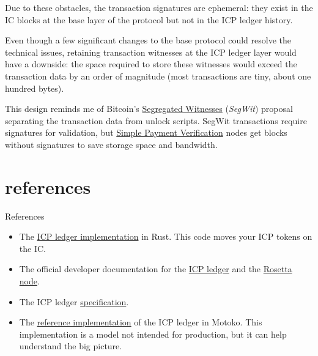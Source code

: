 \documentclass{article}
\begin{document}
Due to these obstacles, the transaction signatures are ephemeral: they exist in the IC blocks at the base layer of the protocol but not in the ICP ledger history.

Even though a few significant changes to the base protocol could resolve the technical issues, retaining transaction witnesses at the ICP ledger layer would have a downside: the space required to store these witnesses would exceed the transaction data by an order of magnitude (most transactions are tiny, about one hundred bytes).

This design reminds me of Bitcoin's \href{https://en.wikipedia.org/wiki/SegWit}{Segregated Witnesses} (\emph{SegWit}) proposal separating the transaction data from unlock scripts.
SegWit transactions require signatures for validation, but \href{https://en.bitcoinwiki.org/wiki/Simplified_Payment_Verification}{Simple Payment Verification} nodes get blocks without signatures to save storage space and bandwidth.

\section{references}{References}
\begin{itemize}
  \item
    The \href{https://github.com/dfinity/ic/tree/59ad371332f26ee1af54a15c568dd10a2093224c/rs/rosetta-api/icp_ledger/ledger}{ICP ledger implementation} in Rust.
    This code moves your ICP tokens on the IC.
  \item
    The official developer documentation for the \href{https://internetcomputer.org/docs/current/developer-docs/integrations/ledger/}{ICP ledger} and the \href{https://internetcomputer.org/docs/current/developer-docs/integrations/rosetta/}{Rosetta node}.
  \item
    The ICP ledger \href{https://internetcomputer.org/docs/current/references/ledger}{specification}.
  \item
    The \href{https://github.com/dfinity/ledger-ref}{reference implementation} of the ICP ledger in Motoko.
    This implementation is a model not intended for production, but it can help understand the big picture.
\end{itemize}
\end{document}
